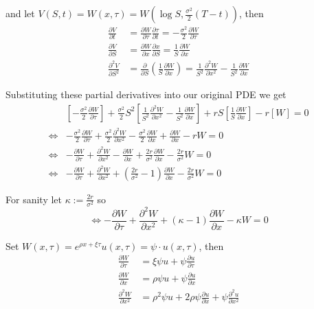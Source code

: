 \documentclass[12pt]{article}
\begin{document}
and let $V(S, t) = W(x, \tau) = W \left( \log S, \frac{\sigma^2}{2}(T - t) \right)$, then
\begin{align*}
	\frac{\partial V}{\partial t} &= \frac{\partial W}{\partial \tau}\frac{\partial \tau}{\partial t} = -\frac{\sigma^2}{2}\frac{\partial W}{\partial \tau} \\
	\frac{\partial V}{\partial S} &= \frac{\partial W}{\partial x} \frac{\partial x}{\partial S} = \frac{1}{S}\frac{\partial W}{\partial x} \\
	\frac{\partial^2 V}{\partial S^2} &= \frac{\partial}{\partial S} \left( \frac{1}{S} \frac{\partial W}{\partial x} \right) = \frac{1}{S^2}\frac{\partial^2 W}{\partial x^2} - \frac{1}{S^2}\frac{\partial W}{\partial x}
\end{align*}

Substituting these partial derivatives into our original PDE we get
\begin{align*}
	& \left[ -\frac{\sigma^2}{2}\frac{\partial W}{\partial \tau} \right] + \frac{\sigma^2}{2}S^2\left[ \frac{1}{S^2}\frac{\partial^2 W}{\partial x^2} - \frac{1}{S^2}\frac{\partial W}{\partial x} \right] + rS\left[ \frac{1}{S}\frac{\partial W}{\partial x} \right] - r\left[ W \right] = 0 \\
	\iff& -\frac{\sigma^2}{2}\frac{\partial W}{\partial \tau} + \frac{\sigma^2}{2}\frac{\partial^2 W}{\partial x^2} - \frac{\sigma^2}{2}\frac{\partial W}{\partial x} + \frac{\partial W}{\partial x} - rW = 0 \\
	\iff& -\frac{\partial W}{\partial \tau} + \frac{\partial^2 W}{\partial x^2} -\frac{\partial W}{\partial x} + \frac{2r}{\sigma^2}\frac{\partial W}{\partial x} - \frac{2r}{\sigma^2}W = 0 \\
	\iff& -\frac{\partial W}{\partial \tau} + \frac{\partial^2 W}{\partial x^2} + \left( \frac{2r}{\sigma^2} - 1 \right) \frac{\partial W}{\partial x} - \frac{2r}{\sigma^2}W = 0
\end{align*}

For sanity let $\kappa := \frac{2r}{\sigma^2}$ so
\begin{equation*}
	\iff -\frac{\partial W}{\partial \tau} + \frac{\partial^2 W}{\partial x^2} + \left( \kappa - 1 \right) \frac{\partial W}{\partial x} - \kappa W = 0
\end{equation*}

Set $W(x,\tau) = e^{\rho x + \xi \tau} u(x, \tau) = \psi \cdot u(x, \tau)$, then
\begin{align*}
	\frac{\partial W}{\partial \tau} &= \xi \psi u + \psi \frac{\partial u}{\partial \tau}\\
	\frac{\partial W}{\partial x} &= \rho \psi u + \psi \frac{\partial u}{\partial x} \\
	\frac{\partial^2 W}{\partial x^2} &= \rho^2 \psi u + 2\rho \psi \frac{\partial u}{\partial x} + \psi \frac{\partial^2 u}{\partial x^2}
\end{align*}
\end{document}
